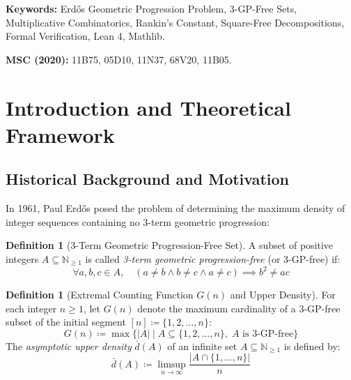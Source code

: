\documentclass[11pt,a4paper]{article}
\theoremstyle{definition}
\newtheorem{definition}[theorem]{Definition}
\begin{document}
\vspace{0.5em}
\noindent\textbf{Keywords:} Erd\H{o}s Geometric Progression Problem, 3-GP-Free Sets, Multiplicative Combinatorics, Rankin's Constant, Square-Free Decompositions, Formal Verification, Lean 4, Mathlib.

\noindent\textbf{MSC (2020):} 11B75, 05D10, 11N37, 68V20, 11B05.

\tableofcontents
\newpage

\section{Introduction and Theoretical Framework}

\subsection{Historical Background and Motivation}
In 1961, Paul Erd\H{o}s \cite{erdos1961} posed the problem of determining the maximum density of integer sequences containing no 3-term geometric progression:

\begin{definition}[3-Term Geometric Progression-Free Set]\label{def:gp_free}
A subset of positive integers $A \subseteq \mathbb{N}_{\ge 1}$ is called \emph{3-term geometric progression-free} (or 3-GP-free) if:
\begin{equation}\label{eq:gp_free_def}
\forall a, b, c \in A, \quad (a \ne b \land b \ne c \land a \ne c) \implies b^2 \ne a c
\end{equation}
\end{definition}

\begin{definition}[Extremal Counting Function $G(n)$ and Upper Density]\label{def:density_gn}
For each integer $n \ge 1$, let $G(n)$ denote the maximum cardinality of a 3-GP-free subset of the initial segment $[n] \coloneqq \{1, 2, \dots, n\}$:
\begin{equation}\label{eq:gn_def}
G(n) \coloneqq \max \{ |A| \mid A \subseteq \{1, 2, \dots, n\}, \; A \text{ is 3-GP-free} \}
\end{equation}
The \emph{asymptotic upper density} $\bar{d}(A)$ of an infinite set $A \subseteq \mathbb{N}_{\ge 1}$ is defined by:
\begin{equation}\label{eq:upper_density}
\bar{d}(A) \coloneqq \limsup_{n \to \infty} \frac{|A \cap \{1, \dots, n\}|}{n}
\end{equation}
\end{definition}
\end{document}

